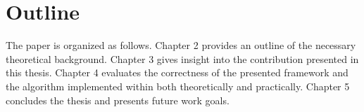 \section{Outline}

The paper is organized as follows. Chapter 2 provides an outline of the necessary theoretical background. Chapter 3 gives insight into the contribution presented in this thesis. Chapter 4 evaluates the correctness of the presented framework and the algorithm implemented within both theoretically and practically. Chapter 5 concludes the thesis and presents future work goals.
